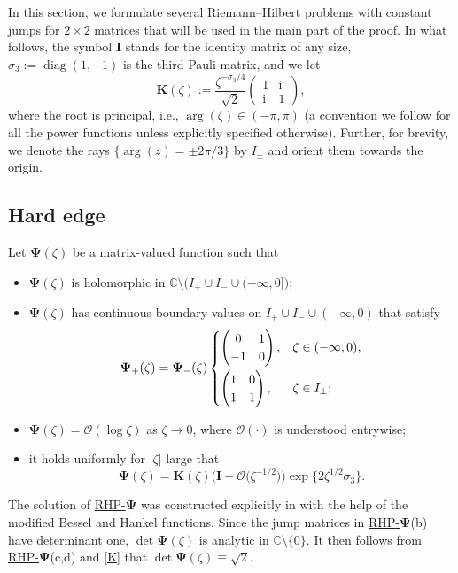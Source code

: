 \documentclass[10pt,a4paper]{amsart}
\numberwithin{equation}{section}
\newcommand{\C}		{\mathbb{C}}
\newcommand{\diag}{\operatorname{diag}}
\renewcommand{\arg}{\operatorname{arg}}
\renewcommand{\det}{\operatorname{det}}
\newcommand{\ic}{\mathrm{i}}
\newcommand{\rhpsi} {\textnormal{RHP}-${\boldsymbol \Psi}$}
\begin{document}
In this section, we formulate several Riemann--Hilbert problems with constant jumps for $ 2\times2 $ matrices that will be used in the main part of the proof. In what follows, the symbol $ \boldsymbol I $ stands for the identity matrix of any size, $ \sigma_3 := \diag(1,-1) $ is the third Pauli matrix, and we let
\begin{equation}
\label{K}
\boldsymbol K(\zeta) := \frac{\zeta^{-\sigma_3/4}}{\sqrt2}\left(\begin{matrix} 1 & \ic \\ \ic & 1 \end{matrix}\right),
\end{equation}
where the root is principal, i.e., $\arg(\zeta)\in(-\pi,\pi)$ (a convention we follow for all the power functions unless explicitly specified otherwise). Further, for brevity, we denote the rays $ \{\arg(z)=\pm2\pi/3\} $ by $ I_\pm $ and orient them towards the origin.

 \subsection{Hard edge}

 Let $\boldsymbol\Psi(\zeta)$ be a matrix-valued function such that
\begin{itemize}\itemsep=0pt
\label{rhpsi}
\item[(a)] $\boldsymbol\Psi(\zeta)$ is holomorphic in $\C\setminus\bigl(I_+\cup I_-\cup(-\infty,0]\bigr)$;
\item[(b)] $\boldsymbol\Psi(\zeta)$ has continuous boundary values on $I_+\cup I_-\cup(-\infty,0)$ that satisfy
\[
\boldsymbol\Psi_+(\zeta) = \boldsymbol\Psi_-(\zeta)
\begin{cases}
\left(\begin{matrix} 0 & 1 \\ -1 & 0 \end{matrix}\right), & \zeta\in(-\infty,0), \vspace{1mm}\\
\left(\begin{matrix} 1 & 0 \\ 1 & 1 \end{matrix}\right), & \zeta\in I_\pm;
\end{cases}
\]
\item[(c)] $ \boldsymbol\Psi(\zeta) = \boldsymbol{\mathcal O}(\log\zeta) $ as $\zeta\to0$, where $ \boldsymbol{\mathcal O}(\cdot) $ is understood entrywise;
\item[(d)] it holds uniformly for $ |\zeta| $ large that
\[
\boldsymbol\Psi(\zeta) = \boldsymbol K(\zeta)\bigl(\boldsymbol I + \boldsymbol{\mathcal O} \bigl(\zeta^{-1/2}\bigr)\bigr)\exp\bigl\{2\zeta^{1/2}\sigma_3\bigr\}.
\]
\end{itemize}
The solution of \hyperref[rhpsi]{\rhpsi} was constructed explicitly in \cite[Section~6]{KMcLVAV04} with the help of the modified Bessel and Hankel functions. Since the jump matrices in \hyperref[rhpsi]{\rhpsi}(b) have determinant one, $ \det \boldsymbol\Psi(\zeta) $ is analytic in $ \C\setminus\{0\} $. It then follows from \hyperref[rhpsi]{\rhpsi}(c,d) and \eqref{K} that $ \det \boldsymbol\Psi(\zeta) \equiv \sqrt 2 $.
\end{document}
